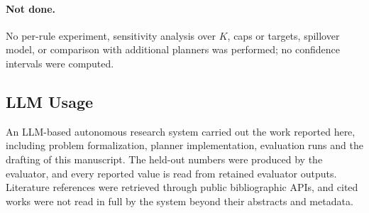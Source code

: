 \documentclass{article}
\begin{document}
\paragraph{Not done.} No per-rule experiment, sensitivity analysis over $K$, caps or targets, spillover model, or comparison with additional planners was performed; no confidence intervals were computed.

\subsection{LLM Usage}
An LLM-based autonomous research system carried out the work reported here, including problem formalization, planner implementation, evaluation runs and the drafting of this manuscript. The held-out numbers were produced by the evaluator, and every reported value is read from retained evaluator outputs. Literature references were retrieved through public bibliographic APIs, and cited works were not read in full by the system beyond their abstracts and metadata.
\end{document}
